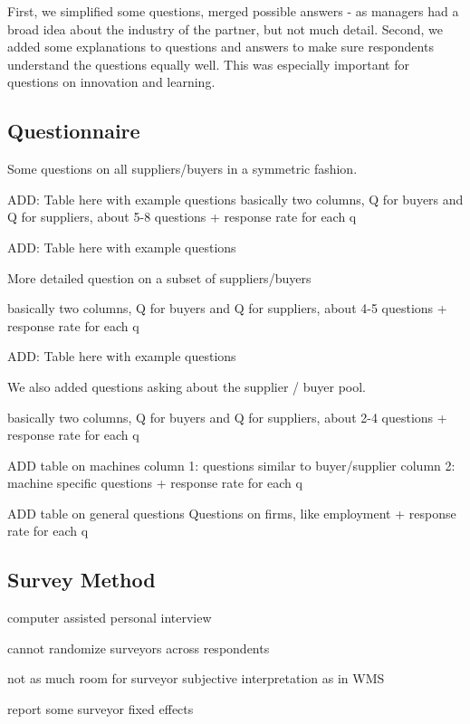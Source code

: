 \documentclass[final, dvipsnames, authoryear,12pt]{elsarticle}
\begin{document}
First, we simplified some questions, merged possible answers - as managers had a broad idea about the industry of the partner, but not much detail. Second, we added some explanations to questions and answers to make sure respondents understand the questions equally well. This was especially important for questions on innovation and learning. 

\subsection{Questionnaire}

Some questions on all suppliers/buyers in a symmetric fashion. 

ADD: Table here with example questions
basically two columns, Q for buyers and Q for suppliers, about 5-8 questions
+ response rate for each q

ADD: Table here with example questions

More detailed question on a subset of suppliers/buyers 

basically two columns, Q for buyers and Q for suppliers, about 4-5 questions
+ response rate for each q

ADD: Table here with example questions

We also added questions asking about the supplier / buyer pool. 

basically two columns, Q for buyers and Q for suppliers, about 2-4 questions
+ response rate for each q



ADD table on machines
column 1: questions similar to buyer/supplier
column 2: machine specific questions
+ response rate for each q


ADD table on general questions
Questions on firms, like employment
+ response rate for each q

\subsection{Survey Method}

computer assisted personal interview

cannot randomize surveyors across respondents

not as much room for surveyor subjective interpretation as in WMS

report some surveyor fixed effects
\end{document}
